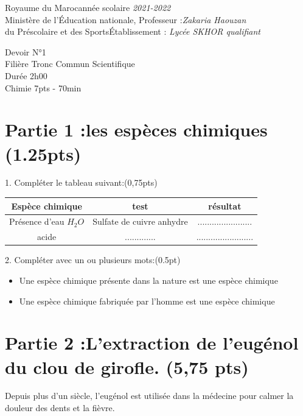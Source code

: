 \documentclass[12pt]{article}
\newcommand\headerMe[2]{\noindent{}#1\hfill#2}
\begin{document}
\headerMe{Royaume du Maroc}{année scolaire \emph{2021-2022}}\\
\headerMe{Ministère de l'Éducation nationale, }{  Professeur :\emph{Zakaria Haouzan}}\\
\headerMe{du Préscolaire et des Sports}{Établissement : \emph{Lycée SKHOR qualifiant}}\\

\begin{center}

    \vspace{-1.5cm}
Devoir  N°1 \\
   Filière Tronc Commun Scientifique\\
Durée 2h00
\\
\hrulefill
\Large{Chimie 7pts - 70min}
\hrulefill\\

\end{center}
 
    \vspace{-1.2cm}
    
\section*{Partie 1 :les espèces chimiques \dotfill (1.25pts) }
	
	1. Compléter le tableau suivant:\dotfill(0,75pts)
\begin{center}
\begin{tabular}{ | c | c | c | }
	\hline
	\textbf{Espèce chimique }& \textbf{test} & \textbf{résultat} \\\hline 
 Présence d’eau $H_2O$ & Sulfate de cuivre anhydre & ....................... \\\hline  
 acide & ............. & ........................\\\hline 
\end{tabular}
\end{center}

2. Compléter avec un ou plusieurs mots:\dotfill(0.5pt)
	\begin{itemize}
		\item Une espèce chimique présente dans la nature est une espèce chimique \dotfill
		\item Une espèce chimique fabriquée par l’homme est une espèce chimique \dotfill
	\end{itemize}
\section*{Partie 2 :L’extraction de l’eugénol du clou de girofle. \dotfill (5,75 pts) }
\hspace{0.5cm}Depuis plus d’un siècle, l’eugénol est utilisée dans la médecine pour calmer la douleur
des dents et la fièvre. 
\end{document}
